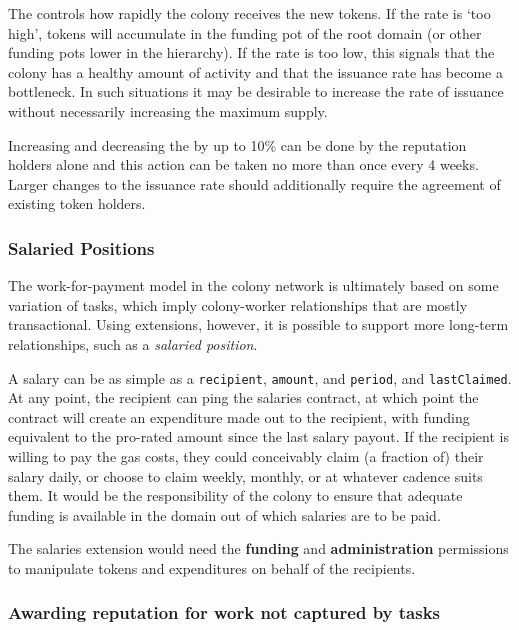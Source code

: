 The  controls how rapidly the colony receives the new tokens. If the rate is `too high', tokens will accumulate in the funding pot of the root domain (or other funding pots lower in the hierarchy). If the rate is too low, this signals that the colony has a healthy amount of activity and that the issuance rate has become a bottleneck. In such situations it may be desirable to increase the rate of issuance without necessarily increasing the maximum supply.

Increasing and decreasing the  by up to 10\% can be done by the reputation holders alone and this action can be taken no more than once every 4 weeks. Larger changes to the issuance rate should additionally require the agreement of existing token holders.

\subsubsection{Salaried Positions}\label{sec:salary}

The work-for-payment model in the colony network is ultimately based on some variation of tasks, which imply colony-worker relationships that are mostly transactional. Using extensions, however, it is possible to support more long-term relationships, such as a \emph{salaried position}.

A salary can be as simple as a \texttt{recipient}, \texttt{amount}, and \texttt{period}, and \texttt{lastClaimed}. At any point, the recipient can ping the salaries contract, at which point the contract will create an expenditure made out to the recipient, with funding equivalent to the pro-rated amount since the last salary payout. If the recipient is willing to pay the gas costs, they could conceivably claim (a fraction of) their salary daily, or choose to claim weekly, monthly, or at whatever cadence suits them. It would be the responsibility of the colony to ensure that adequate funding is available in the domain out of which salaries are to be paid.

The salaries extension would need the \textbf{funding} and \textbf{administration} permissions to manipulate tokens and expenditures on behalf of the recipients.

\subsubsection{Awarding reputation for work not captured by tasks}

